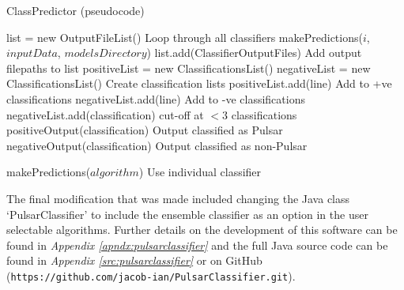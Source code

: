 \documentclass{article}
\begin{document}
\begin{algorithm}
    \caption{ClassPredictor (pseudocode)}
    \label{alg:classpredictor}
    \begin{algorithmic}[1]
            \State list = new OutputFileList()
                \Comment Loop through all classifiers
                \State makePredictions($i$, $inputData$, $modelsDirectory$)
                \State list.add(ClassifierOutputFiles)
                \Comment Add output filepaths to list
            \EndFor
            \State positiveList = new ClassificationsList()
            \State negativeList = new ClassificationsList()
            \Comment Create classification lists
                        \State positiveList.add(line)
                        \Comment Add to +ve classifications
                    \EndFor
                        \State negativeList.add(line)
                        \Comment Add to -ve classifications
                    \EndFor
                \EndIf
            \EndFor
                    \State negativeList.add(classification)
                    \Comment cut-off at $< 3$ classifications
                \Else
                    \State positiveOutput(classification)
                    \Comment Output classified as Pulsar
                \EndIf
            \EndFor
                \State negativeOutput(classification)
                \Comment Output classified as non-Pulsar
            \EndFor

        \Else 
            \State makePredictions($algorithm$)
            \Comment Use individual classifier
        \EndIf
    \end{algorithmic}
\end{algorithm}

The final modification that was made included changing the Java class `PulsarClassifier' to include the ensemble classifier as an option in the user selectable algorithms. Further details on the development of this software can be found in \emph{Appendix \ref{apndx:pulsarclassifier}} and the full Java source code can be found in \emph{Appendix \ref{src:pulsarclassifier}} or on GitHub (\verb|https://github.com/jacob-ian/PulsarClassifier.git|).
\end{document}
